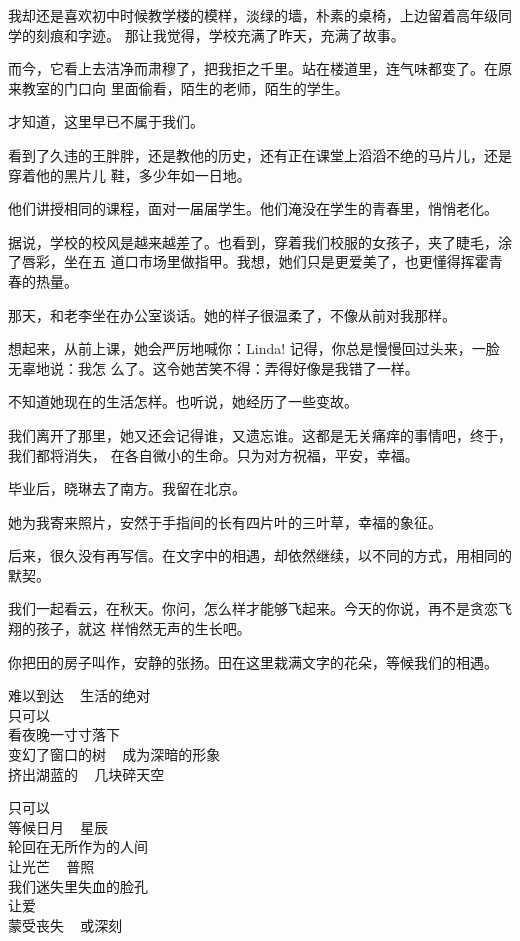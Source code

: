 		我却还是喜欢初中时候教学楼的模样，淡绿的墙，朴素的桌椅，上边留着高年级同学的刻痕和字迹。
	那让我觉得，学校充满了昨天，充满了故事。

		而今，它看上去洁净而肃穆了，把我拒之千里。站在楼道里，连气味都变了。在原来教室的门口向
	里面偷看，陌生的老师，陌生的学生。

		才知道，这里早已不属于我们。

		看到了久违的王胖胖，还是教他的历史，还有正在课堂上滔滔不绝的马片儿，还是穿着他的黑片儿
	鞋，多少年如一日地。

		他们讲授相同的课程，面对一届届学生。他们淹没在学生的青春里，悄悄老化。


		据说，学校的校风是越来越差了。也看到，穿着我们校服的女孩子，夹了睫毛，涂了唇彩，坐在五
	道口市场里做指甲。我想，她们只是更爱美了，也更懂得挥霍青春的热量。


		那天，和老李坐在办公室谈话。她的样子很温柔了，不像从前对我那样。

		想起来，从前上课，她会严厉地喊你：Linda! 记得，你总是慢慢回过头来，一脸无辜地说：我怎
	么了。这令她苦笑不得：弄得好像是我错了一样。

		不知道她现在的生活怎样。也听说，她经历了一些变故。

		我们离开了那里，她又还会记得谁，又遗忘谁。这都是无关痛痒的事情吧，终于，我们都将消失，
	在各自微小的生命。只为对方祝福，平安，幸福。


		毕业后，晓琳去了南方。我留在北京。

		她为我寄来照片，安然于手指间的长有四片叶的三叶草，幸福的象征。

		后来，很久没有再写信。在文字中的相遇，却依然继续，以不同的方式，用相同的默契。


		我们一起看云，在秋天。你问，怎么样才能够飞起来。今天的你说，再不是贪恋飞翔的孩子，就这
	样悄然无声的生长吧。


		你把田的房子叫作，安静的张扬。田在这里栽满文字的花朵，等候我们的相遇。

	\endwriting


	\longpoem{}{}{}

		难以到达 ~ 生活的绝对 \\
		只可以 \\
		看夜晚一寸寸落下 \\
		变幻了窗口的树 ~ 成为深暗的形象 \\
		挤出湖蓝的 ~ 几块碎天空

		只可以 \\
		等候日月 ~ 星辰 \\
		轮回在无所作为的人间 \\
		让光芒 ~ 普照 \\
		我们迷失里失血的脸孔 \\
		让爱 \\
		蒙受丧失 ~ 或深刻

